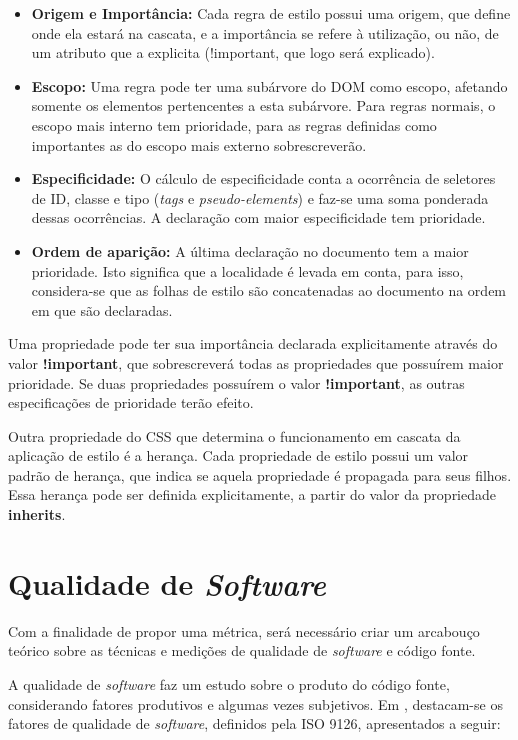 \begin{itemize}
	\item \textbf{Origem e Importância:} 
	Cada regra de estilo possui uma origem, que define onde ela estará na cascata, e a importância se refere à utilização, ou não, de um atributo que a explicita (!important, que logo será explicado).
	\item \textbf{Escopo:}
	Uma regra pode ter uma subárvore do DOM como escopo, afetando somente os elementos pertencentes a esta subárvore. Para regras normais, o escopo mais interno tem prioridade, para as regras definidas como importantes as do escopo mais externo sobrescreverão.
	\item \textbf{Especificidade:}
	O cálculo de especificidade conta a ocorrência de seletores de ID, classe e tipo (\textit{tags} e \textit{pseudo-elements}) e faz-se uma soma ponderada dessas ocorrências. A declaração com maior especificidade tem prioridade.
	\item \textbf{Ordem de aparição:}
	A última declaração no documento tem a maior prioridade. Isto significa que a localidade é levada em conta, para isso, considera-se que as folhas de estilo são concatenadas ao documento na ordem em que são declaradas.
\end{itemize}

Uma propriedade pode ter sua importância declarada explicitamente através do valor \textbf{!important}, que sobrescreverá todas as propriedades que possuírem maior prioridade. Se duas propriedades possuírem o valor \textbf{!important}, as outras especificações de prioridade terão efeito.

Outra propriedade do CSS que determina o funcionamento em cascata da aplicação de estilo é a herança. Cada propriedade de estilo possui um valor padrão de herança, que indica se aquela propriedade é propagada para seus filhos. Essa herança pode ser definida explicitamente, a partir do valor da propriedade \textbf{inherits}. 

\section{Qualidade de \textit{Software}}

Com a finalidade de propor uma métrica, será necessário criar um arcabouço teórico sobre as técnicas e medições de qualidade de \textit{software} e código fonte.

A qualidade de \textit{software} faz um estudo sobre o produto do código fonte, considerando fatores produtivos e algumas vezes subjetivos. Em , destacam-se os fatores de qualidade de \textit{software}, definidos pela ISO 9126, apresentados a seguir:

